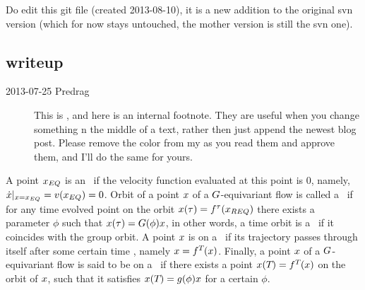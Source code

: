 

\noindent
{\color{red} Do edit this git file (created 2013-08-10),
it is a new addition to the original svn version (which for now
stays untouched, the mother version is still the svn one).
}
\bigskip\bigskip

\subsection{{\twoMode} writeup}
\label{chap:2modesBBproj}

\begin{description}

\item[2013-07-25  Predrag] This is ,
and here is an internal footnote. They
are useful when you change something n the middle of a text, rather then
just append the newest blog post. Please remove the color from my
 as you read them and approve them, and I'll do the same
for yours.



\end{description}

                     \toCB
A point $x_{EQ}$ is an \eqv\ if the velocity function evaluated at this
point is 0, namely, $\dot{x}|_{x=x_{EQ}} = v({x_{EQ}}) = 0$.
Orbit of
a point $x$ of a $G$-equivariant flow is called a \reqv\ if for any
time evolved point on the orbit $x(\tau) = f^{\tau}(x_{REQ})$ there
exists a parameter $\phi$ such that $x(\tau) = G(\phi) x$, in other
words, a time orbit is a \reqv\ if it coincides with the group orbit.
 A
point $x$ is on a \po\ if its trajectory passes through itself after some
certain time \period{}, namely $x = f^{{T_{}}}(x)$. Finally, a point $x$ of a
$G$-equivariant flow is said to be on a \rpo\ if there exists a
point $x({T_{}}) = f^{T_{}}(x)$ on the orbit of $x$, such that it satisfies $x({T_{}}) =
g(\phi) x$ for a certain $\phi$.


